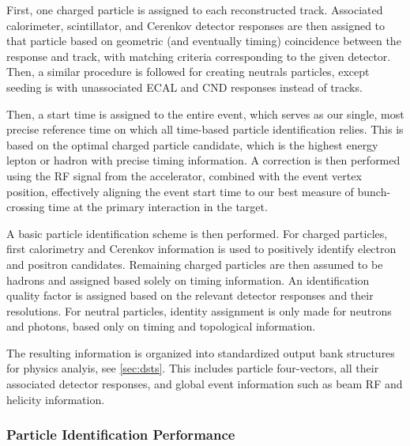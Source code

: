 \documentclass[3p,times,twocolumn]{elsarticle}
\begin{document}
First, one charged particle is assigned to each reconstructed track.  Associated calorimeter, scintillator, and C{e}renkov detector responses are then assigned to that particle based on geometric (and eventually timing) coincidence between the response and track, with matching criteria corresponding to the given detector.  Then, a similar procedure is followed for creating neutrals particles, except seeding is with unassociated ECAL and CND responses instead of tracks.

Then, a start time is assigned to the entire event, which serves as our single, most precise reference time on which all time-based particle identification relies.  This is based on the optimal charged particle candidate, which is the highest energy lepton or hadron with precise timing information.  A correction is then performed using the RF signal from the accelerator, combined with the event vertex position, effectively aligning the event start time to our best measure of bunch-crossing time at the primary interaction in the target.

A basic particle identification scheme is then performed.  For charged particles, first calorimetry and Cerenkov information is used to positively identify electron and positron candidates.  Remaining charged particles are then assumed to be hadrons and assigned based solely on timing information.  An identification quality factor is assigned based on the relevant detector responses and their resolutions.  For neutral particles, identity assignment is only made for neutrons and photons, based only on timing and topological information.

The resulting information is organized into standardized output bank structures for physics analyis, see \ref{sec:dsts}.  This includes particle four-vectors, all their associated detector responses, and global event information such as beam RF and helicity information.

\subsubsection{Particle Identification Performance}
\end{document}
